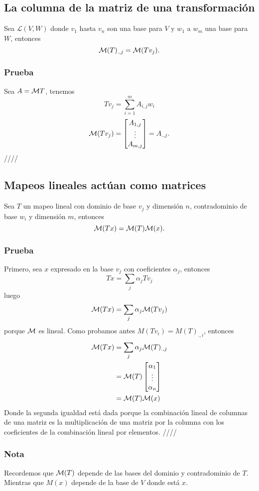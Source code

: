 \documentclass{article}
\begin{document}
\subsection{La columna de la matriz de una transformación}
Sea $\mathcal{L}(V,W)$ donde $v_1$ hasta $v_n$ son una base para $V$
y $w_1$ a $w_m$ una base para $W$, entonces
$$\mathcal{M}(T)_{.,j} = \mathcal{M} (Tv_j).$$
\subsubsection*{Prueba}
Sea $A=\mathcal{M} T$, tenemos
$$Tv_j = \sum^m_{i=1}A_{i,j} w_i$$
$$\mathcal{M}(Tv_j) = \begin{bmatrix}
    A_{1,j}\\
    \vdots\\
    A_{m,j}
\end{bmatrix}
=
A_{.,j}.$$
\hfill ////

\subsection{Mapeos lineales actúan como matrices}
Sea $T$ un mapeo lineal con dominio de base $v_j$ y dimensión $n$,
contradominio de base $w_i$ y dimensión $m$, entonces
$$\mathcal{M} (Tx) = \mathcal{M} (T)\mathcal{M} (x).$$
\subsubsection*{Prueba}
Primero, sea $x$ expresado en la base $v_j$ con coeficientes $\alpha_j$,
entonces $$Tx =\sum_j\alpha_j Tv_j$$
luego $$\mathcal{M}(Tx)=\sum_j\alpha_j\mathcal{M}(Tv_j)$$
porque $\mathcal{M}$ es lineal. Como probamos antes
$M(Tv_i) = M(T)_{.,i}$, entonces
\begin{align*}
    \mathcal{M}(Tx) &= \sum_j\alpha_j\mathcal{M}(T)_{.,j}\\
    &= \mathcal{M}(T) \begin{bmatrix}
        \alpha_1 \\
        \vdots \\
        \alpha_n
    \end{bmatrix}\\
    &= \mathcal{M}(T)\mathcal{M}(x)
\end{align*}
Donde la segunda igualdad está dada porque la combinación
lineal de columnas de una matriz es la multiplicación de una matriz
por la columna con los coeficientes de la combinación lineal por 
elementos. \hfill ////

\subsubsection{Nota}
Recordemos que $\mathcal{M}(T)$ depende de las bases del dominio y 
contradominio de $T$. Mientras que $M(x)$ depende de la base
de $V$ donde está $x$.
\end{document}
